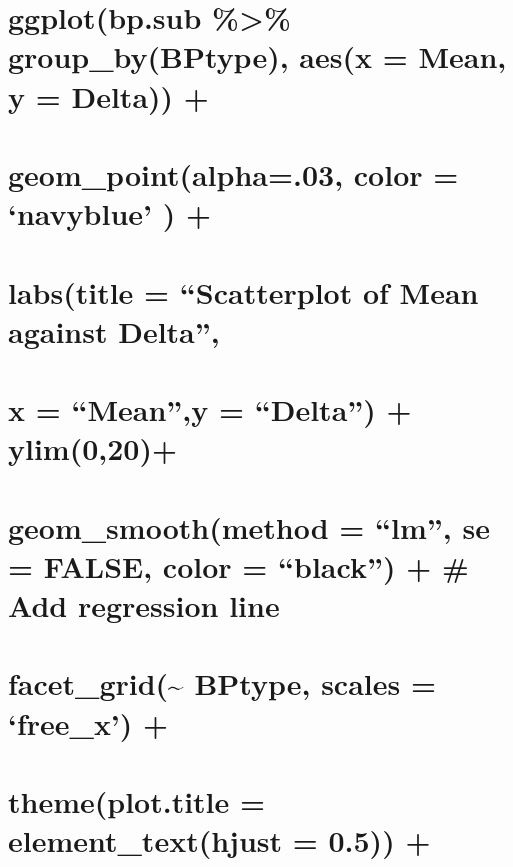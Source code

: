 \documentclass[
]{article}
\begin{document}
\hypertarget{ggplotbp.sub-group_bybptype-aesx-mean-y-delta}{%
\section{ggplot(bp.sub \%\textgreater\% group\_by(BPtype), aes(x = Mean, y = Delta)) +}\label{ggplotbp.sub-group_bybptype-aesx-mean-y-delta}}

\hypertarget{geom_pointalpha.03-color-navyblue}{%
\section{geom\_point(alpha=.03, color = `navyblue' ) +}\label{geom_pointalpha.03-color-navyblue}}

\hypertarget{labstitle-scatterplot-of-mean-against-delta}{%
\section{\texorpdfstring{labs(title = ``Scatterplot of Mean against \textbar Delta\textbar{}'',}{labs(title = ``Scatterplot of Mean against \textbar Delta\textbar'',}}\label{labstitle-scatterplot-of-mean-against-delta}}

\hypertarget{x-meany-delta-ylim020}{%
\section{\texorpdfstring{x = ``Mean'',y = ``\textbar Delta\textbar{}'') + ylim(0,20)+}{x = ``Mean'',y = ``\textbar Delta\textbar'') + ylim(0,20)+}}\label{x-meany-delta-ylim020}}

\hypertarget{geom_smoothmethod-lm-se-false-color-black-add-regression-line}{%
\section{geom\_smooth(method = ``lm'', se = FALSE, color = ``black'') + \# Add regression line}\label{geom_smoothmethod-lm-se-false-color-black-add-regression-line}}

\hypertarget{facet_grid-bptype-scales-free_x}{%
\section{facet\_grid(\textasciitilde{} BPtype, scales = `free\_x') +}\label{facet_grid-bptype-scales-free_x}}

\hypertarget{themeplot.title-element_texthjust-0.5}{%
\section{theme(plot.title = element\_text(hjust = 0.5)) +}\label{themeplot.title-element_texthjust-0.5}}
\end{document}
